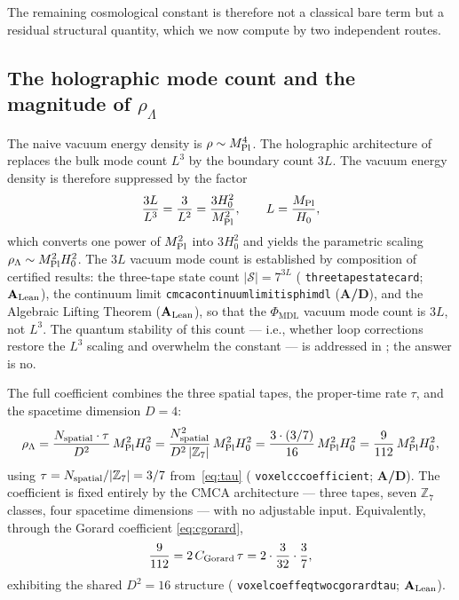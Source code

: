 \documentclass[11pt]{article}
\theoremstyle{remark}
\newcommand{\PHIMDL}{\Phi_{\mathrm{MDL}}}
\newcommand{\ZS}{\mathbb{Z}_7}
\newcommand{\lean}[1]{%
  \penalty-100
  \begingroup\def\_{\textunderscore\allowbreak}\texttt{#1}\endgroup}
\newcommand{\MPl}{M_{\rm Pl}}
\newcommand{\Hnought}{H_0}
\newcommand{\CMCA}{\text{CMCA}}
\newcommand{\CGorard}{C_{\rm Gorard}}
\newcommand{\CatAL}{\ensuremath{\textbf{A}_{\rm Lean}}}
\newcommand{\CatAD}{\textbf{A/D}}
\begin{document}
The remaining cosmological
constant is therefore not a classical bare term but a residual structural quantity,
which we now compute by two independent routes.

\subsection{The holographic mode count and the magnitude of $\rho_\Lambda$}
\label{sec:cc-magnitude}

The naive vacuum energy density is $\rho \sim \MPl^4$. The holographic architecture
of  replaces the bulk mode count $L^3$ by the boundary count $3L$.
The vacuum energy density is therefore suppressed by the factor
\begin{equation}
  \frac{3L}{L^3} = \frac{3}{L^2} = \frac{3\Hnought^2}{\MPl^2},
  \qquad L = \frac{\MPl}{\Hnought},
\end{equation}
which converts one power of $\MPl^2$ into $3\Hnought^2$ and yields the parametric
scaling $\rho_\Lambda \sim \MPl^2\Hnought^2$. The $3L$ vacuum mode count is
established by composition of certified results: the three-tape state count
$|\mathcal{S}| = 7^{3L}$ (\lean{three\_tape\_state\_card}; \CatAL), the continuum
limit \lean{cmca\_continuum\_limit\_is\_phimdl} (\CatAD), and the Algebraic Lifting
Theorem (\CatAL), so that the $\PHIMDL$ vacuum mode count is $3L$, not $L^3$.
The quantum stability of this count --- i.e., whether loop corrections restore
the $L^3$ scaling and overwhelm the constant --- is addressed in
; the answer is no.

The full coefficient combines the three spatial tapes, the proper-time rate $\tau$,
and the spacetime dimension $D = 4$:
\begin{equation}
  \rho_\Lambda
  = \frac{N_{\rm spatial}\cdot\tau}{D^2}\,\MPl^2\Hnought^2
  = \frac{N_{\rm spatial}^2}{D^2\,|\ZS|}\,\MPl^2\Hnought^2
  = \frac{3\cdot(3/7)}{16}\,\MPl^2\Hnought^2
  = \frac{9}{112}\,\MPl^2\Hnought^2,
  \label{eq:rhocc}
\end{equation}
using $\tau = N_{\rm spatial}/|\ZS| = 3/7$ from~\eqref{eq:tau}
(\lean{voxel\_cc\_coefficient}; \CatAD). The coefficient is fixed entirely by the
$\CMCA$ architecture --- three tapes, seven $\ZS$ classes, four spacetime dimensions
--- with no adjustable input. Equivalently, through the Gorard coefficient
\eqref{eq:cgorard},
\begin{equation}
  \frac{9}{112} = 2\,\CGorard\,\tau = 2\cdot\frac{3}{32}\cdot\frac{3}{7},
  \label{eq:coeff-gorard}
\end{equation}
exhibiting the shared $D^2 = 16$ structure
(\lean{voxel\_coeff\_eq\_two\_c\_gorard\_tau}; \CatAL).
\end{document}
